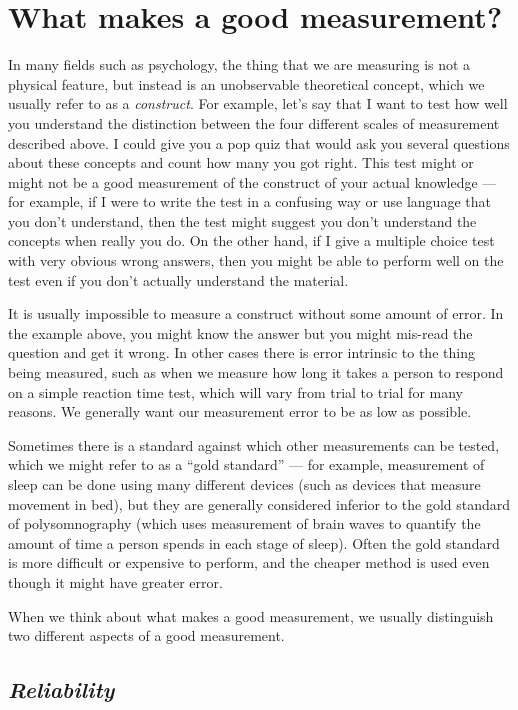 \documentclass[]{book}
\theoremstyle{definition}
\theoremstyle{definition}
\theoremstyle{definition}
\theoremstyle{remark}
\begin{document}
\section{What makes a good
measurement?}\label{what-makes-a-good-measurement}

In many fields such as psychology, the thing that we are measuring is
not a physical feature, but instead is an unobservable theoretical
concept, which we usually refer to as a \emph{construct}. For example,
let's say that I want to test how well you understand the distinction
between the four different scales of measurement described above. I
could give you a pop quiz that would ask you several questions about
these concepts and count how many you got right. This test might or
might not be a good measurement of the construct of your actual
knowledge --- for example, if I were to write the test in a confusing
way or use language that you don't understand, then the test might
suggest you don't understand the concepts when really you do. On the
other hand, if I give a multiple choice test with very obvious wrong
answers, then you might be able to perform well on the test even if you
don't actually understand the material.

It is usually impossible to measure a construct without some amount of
error. In the example above, you might know the answer but you might
mis-read the question and get it wrong. In other cases there is error
intrinsic to the thing being measured, such as when we measure how long
it takes a person to respond on a simple reaction time test, which will
vary from trial to trial for many reasons. We generally want our
measurement error to be as low as possible.

Sometimes there is a standard against which other measurements can be
tested, which we might refer to as a ``gold standard'' --- for example,
measurement of sleep can be done using many different devices (such as
devices that measure movement in bed), but they are generally considered
inferior to the gold standard of polysomnography (which uses measurement
of brain waves to quantify the amount of time a person spends in each
stage of sleep). Often the gold standard is more difficult or expensive
to perform, and the cheaper method is used even though it might have
greater error.

When we think about what makes a good measurement, we usually
distinguish two different aspects of a good measurement.

\subsection{\texorpdfstring{\emph{Reliability}}{Reliability}}\label{reliability}
\end{document}
